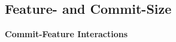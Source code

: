 \subsection*{Feature- and Commit-Size}




































































\iffalse
\textbf{Commit-Feature Interactions}

